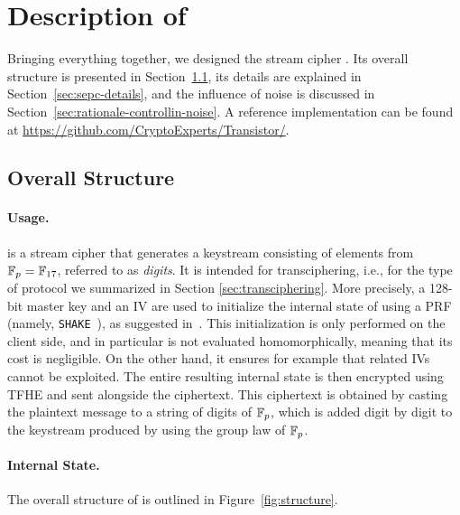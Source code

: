\section{Description of \coolName}
\label{sec:description}


Bringing everything together, we designed the stream cipher \coolName{}.
Its overall structure is presented in Section~\ref{sec:description-structure}, its details are explained in Section~\ref{sec:sepc-details}, and the influence of noise is discussed in Section~\ref{sec:rationale-controllin-noise}. A reference implementation can be found at \url{https://github.com/CryptoExperts/Transistor/}.

\subsection{Overall Structure}
\label{sec:description-structure}


\paragraph{Usage.}
\label{sec:usage}

\coolName{} is a stream cipher that generates a keystream consisting of elements from \( \mathbb{F}_{p} = \mathbb{F}_{17} \), referred to as {\em digits}.  It is intended for transciphering, i.e., for the type of protocol we summarized in Section \ref{sec:transciphering}.
More precisely, a 128-bit master key and an IV are used to initialize the internal state of \coolName{} using  a PRF (namely, {\tt SHAKE}~\cite{sha-3}), as suggested in~\cite{FSE:BerGil07}. This initialization  is only performed on the client side, and in particular is not evaluated homomorphically, meaning that its cost is negligible. On the other hand, it ensures for example that related IVs cannot be exploited. The entire resulting internal state is then encrypted using \gls{TFHE} and sent alongside the ciphertext. This ciphertext is obtained by casting the plaintext message to a string of digits of $\mathbb{F}_{p}$, which is added digit by digit to the keystream produced by \coolName{} using the group law of $\mathbb{F}_{p}$.



\paragraph{Internal State.}
The overall structure of \coolName{} is outlined in Figure~\ref{fig:structure}.

